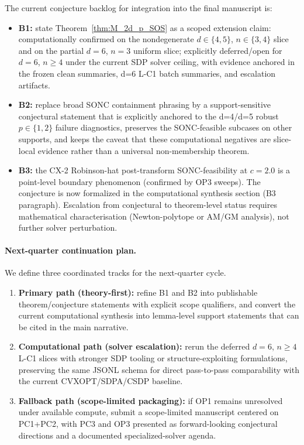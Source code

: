 \documentclass{article}
\begin{document}
The current conjecture backlog for integration into the final manuscript is:
\begin{itemize}
    \item \textbf{B1:} state Theorem~\ref{thm:M_2d_p_SOS} as a scoped extension claim:
    computationally confirmed on the nondegenerate $d\in\{4,5\}$, $n\in\{3,4\}$
    slice and on the partial $d=6$, $n=3$ uniform slice; explicitly deferred/open
    for $d=6$, $n\geq 4$ under the current SDP solver ceiling, with evidence anchored
    in the frozen clean summaries, d=6 L-C1 batch summaries, and escalation artifacts.
    \item \textbf{B2:} replace broad SONC containment phrasing by a support-sensitive
    conjectural statement that is explicitly anchored to the d=4/d=5 robust
    $p\in\{1,2\}$ failure diagnostics, preserves the SONC-feasible subcases on
    other supports, and keeps the caveat that these computational negatives are
    slice-local evidence rather than a universal non-membership theorem.
    \item \textbf{B3:} the CX-2 Robinson-hat post-transform SONC-feasibility at $c=2.0$
    is a point-level boundary phenomenon (confirmed by OP3 sweeps). The conjecture is
    now formalized in the computational synthesis section (B3 paragraph). Escalation
    from conjectural to theorem-level status requires mathematical characterisation
    (Newton-polytope or AM/GM analysis), not further solver perturbation.
\end{itemize}

\paragraph{Next-quarter continuation plan.}
We define three coordinated tracks for the next-quarter cycle.
\begin{enumerate}
    \item \textbf{Primary path (theory-first):}
    refine B1 and B2 into publishable theorem/conjecture statements with explicit
    scope qualifiers, and convert the current computational synthesis into lemma-level
    support statements that can be cited in the main narrative.
    \item \textbf{Computational path (solver escalation):}
    rerun the deferred $d=6$, $n\geq 4$ L-C1 slices with stronger SDP tooling or
    structure-exploiting formulations, preserving the same JSONL schema for direct
    pass-to-pass comparability with the current CVXOPT/SDPA/CSDP baseline.
    \item \textbf{Fallback path (scope-limited packaging):}
    if OP1 remains unresolved under available compute, submit a scope-limited
    manuscript centered on PC1+PC2, with PC3 and OP3 presented as forward-looking
    conjectural directions and a documented specialized-solver agenda.
\end{enumerate}
\end{document}
